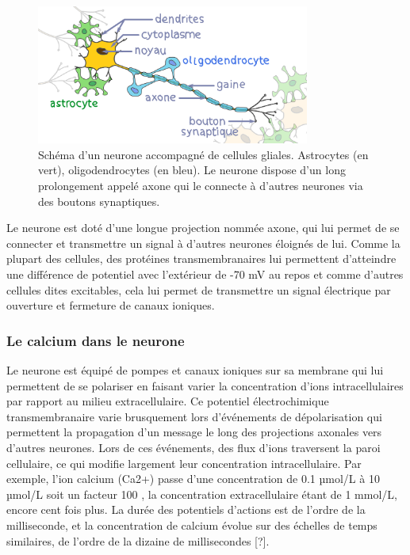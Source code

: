 \begin{figure}
\centering
\includegraphics[width=0.8\textwidth]{./files/neurone.svg.png}
\caption{Schéma d'un neurone accompagné de cellules gliales. Astrocytes (en vert), oligodendrocytes (en bleu). Le neurone dispose d'un long prolongement appelé axone qui le connecte à d'autres neurones via des boutons synaptiques.}
\end{figure}

Le neurone est doté d'une longue projection nommée axone, qui lui permet de se connecter et transmettre un signal à d'autres neurones éloignés de lui. Comme la plupart des cellules, des protéines transmembranaires lui permettent d'atteindre une différence de potentiel avec l'extérieur de -70 mV au repos et comme d'autres cellules dites excitables, cela lui permet de transmettre un signal électrique par ouverture et fermeture de canaux ioniques.

\subsubsection{Le calcium dans le neurone}

Le neurone est équipé de pompes et canaux ioniques sur sa membrane qui lui permettent de se polariser en faisant varier la concentration d'ions intracellulaires par rapport au milieu extracellulaire. Ce potentiel électrochimique transmembranaire varie brusquement lors d'événements de dépolarisation qui permettent la propagation d'un message le long des projections axonales vers d'autres neurones. Lors de ces événements, des flux d'ions traversent la paroi cellulaire, ce qui modifie largement leur concentration intracellulaire. Par exemple, l'ion calcium (Ca2+) passe d'une concentration de 0.1 µmol/L à 10 µmol/L soit un facteur 100 \cite{grienberger_imaging_2012}, la concentration extracellulaire étant de 1 mmol/L, encore cent fois plus. La durée des potentiels d'actions est de l'ordre de la milliseconde, et la concentration de calcium évolue sur des échelles de temps similaires, de l'ordre de la dizaine de millisecondes [?].

